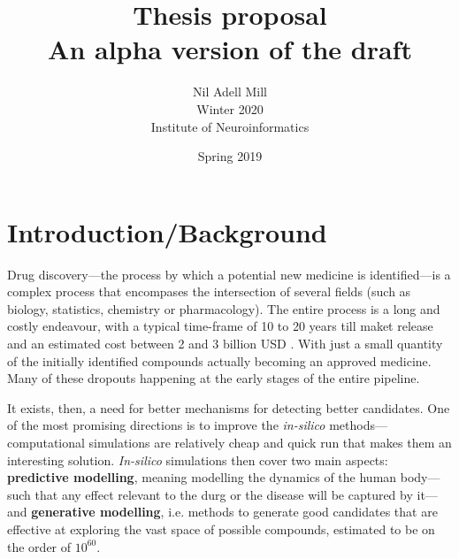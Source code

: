 \documentclass{article}
\begin{document}
\title{\Large Thesis proposal \\ \small An alpha version of the draft}
\author{Nil Adell Mill \\
        Winter 2020 \\
        Institute of Neuroinformatics \\}
\date{Spring 2019}

\maketitle

    \section*{Introduction/Background}  

Drug discovery—the process by which a potential new medicine is identified---is a
 complex process that encompases the intersection of several fields (such as biology,
 statistics, chemistry or pharmacology). The entire process is a long and costly
 endeavour, with a typical time-frame of 10 to 20 years till maket release and an
 estimated cost between 2 and 3 billion USD \cite{Schneider2019, Scannell2012}. With
 just a small quantity of the initially identified compounds actually becoming an
 approved medicine. Many of these dropouts happening at the early stages of the entire
 pipeline.

It exists, then, a need for better mechanisms for detecting better candidates. One of
 the most promising directions is to improve the \emph{in-silico}
 methods---computational simulations are relatively cheap and quick run that makes them
 an interesting solution. \emph{In-silico} simulations then cover two main aspects:
 \textbf{predictive modelling}, meaning modelling the dynamics of the human body---such
 that any effect relevant to the durg or the disease will be captured by it---and
 \textbf{generative modelling}, i.e. methods to generate good candidates that are
 effective at exploring the vast space of possible compounds, estimated to be on the
 order of $10^{60}$\cite{Reymond2012}.



\end{document}
